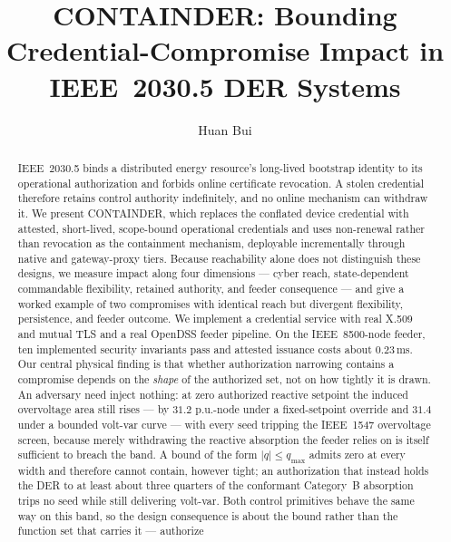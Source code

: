 \documentclass[review]{elsarticle}
\begin{document}
\begin{frontmatter}

\title{CONTAINDER: Bounding Credential-Compromise Impact in
IEEE~2030.5 DER Systems}

\author{Huan Bui}

\begin{abstract}
IEEE~2030.5 binds a distributed energy resource's long-lived bootstrap identity to its
operational authorization and forbids online certificate revocation. A stolen credential
therefore retains control authority indefinitely, and no online mechanism can withdraw it. We
present CONTAINDER, which replaces the conflated device credential with attested, short-lived,
scope-bound operational credentials and uses non-renewal rather than revocation as the
containment mechanism, deployable incrementally through native and gateway-proxy tiers. Because
reachability alone does not distinguish these designs, we measure impact along four dimensions
--- cyber reach, state-dependent commandable flexibility, retained authority, and feeder
consequence --- and give a worked example of two compromises with identical reach but divergent
flexibility, persistence, and feeder outcome. We implement a credential service with real X.509
and mutual TLS and a real OpenDSS feeder pipeline. On the IEEE~8500-node feeder, ten implemented
security invariants pass and attested issuance costs about $0.23$\,ms. Our central physical
finding is that whether authorization narrowing contains a compromise depends on the \emph{shape}
of the authorized set, not on how tightly it is drawn. An adversary need inject nothing: at zero
authorized reactive setpoint the induced overvoltage area still rises --- by $31.2$ p.u.-node under
a fixed-setpoint override and $31.4$ under a bounded volt-var curve --- with every seed tripping
the IEEE~1547 overvoltage screen, because merely withdrawing the reactive absorption the feeder
relies on is itself sufficient to breach the band. A bound of the form $|q| \le q_{\max}$ admits
zero at every width and therefore cannot contain, however tight; an authorization that instead
holds the DER to at least about three quarters of the conformant Category~B absorption trips no
seed while still delivering volt-var. Both control primitives behave the same way on this band, so
the design consequence is about the bound rather than the function set that carries it --- authorize

\end{abstract}
\end{frontmatter}
\end{document}
